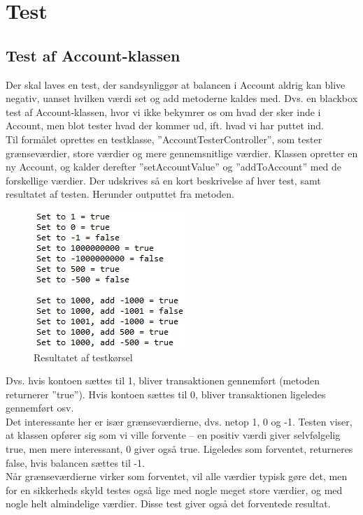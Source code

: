 \section{Test}
\subsection{Test af Account-klassen}
Der skal laves en test, der sandsynliggør at balancen i Account aldrig kan blive negativ, uanset hvilken værdi set og add metoderne kaldes med. Dvs. en blackbox test af Account-klassen, hvor vi ikke bekymrer os om hvad der sker inde i Account, men blot tester hvad der kommer ud, ift. hvad vi har puttet ind.
\\

Til formålet oprettes en testklasse, ”AccountTesterController”, som tester grænseværdier, store værdier og mere gennemsnitlige værdier. Klassen opretter en ny Account, og kalder derefter ”setAccountValue” og ”addToAccount” med de forskellige værdier. Der udskrives så en kort beskrivelse af hver test, samt resultatet af testen. Herunder outputtet fra metoden.
\begin{figure}[!ht]
\centering
\includegraphics[scale=0.4]{test-illustrationer1.jpg}
\caption[<Text for the list of figures>]{Resultatet af testkørsel}
\label{fig:figure 2} 
\end{figure}
Dvs. hvis kontoen sættes til 1, bliver transaktionen gennemført (metoden returnerer ”true”). Hvis kontoen sættes til 0, bliver transaktionen ligeledes gennemført osv.
\\

Det interessante her er især grænseværdierne, dvs. netop 1, 0 og -1. Testen viser, at klassen opfører sig som vi ville forvente – en positiv værdi giver selvfølgelig true, men mere interessant, 0 giver også true. Ligeledes som forventet, returneres false, hvis balancen sættes til -1.
\\

Når grænseværdierne virker som forventet, vil alle værdier typisk gøre det, men for en sikkerheds skyld testes også lige med nogle meget store værdier, og med nogle helt almindelige værdier. Disse test giver også det forventede resultat.
\\

